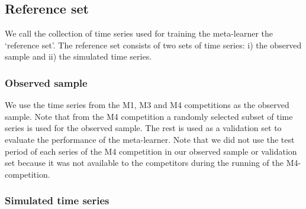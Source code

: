 \documentclass[11pt,a4paper,]{article}
\begin{document}
\hypertarget{reference-set}{%
\subsection{Reference set}\label{reference-set}}

We call the collection of time series used for training the meta-learner the `reference set'. The reference set consists of two sets of time series: i) the observed sample and ii) the simulated time series.

\hypertarget{observed-sample}{%
\subsubsection{Observed sample}\label{observed-sample}}

We use the time series from the M1, M3 and M4 competitions as the observed sample. Note that from the M4 competition a randomly selected subset of time series is used for the observed sample. The rest is used as a validation set to evaluate the performance of the meta-learner. Note that we did not use the test period of each series of the M4 competition in our observed sample or validation set because it was not available to the competitors during the running of the M4-competition.

\hypertarget{simulated-time-series}{%
\subsubsection{Simulated time series}\label{simulated-time-series}}
\end{document}
